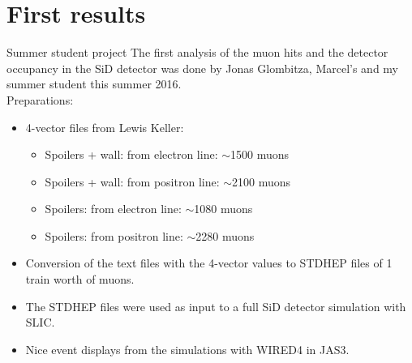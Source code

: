 \documentclass[xcolor={dvipsnames}]{beamer}
\begin{document}
\section{First results}
\begin{frame}{Summer student project}
The first analysis of the muon hits and the detector occupancy in the SiD detector was done by Jonas Glombitza, Marcel's and my summer student this summer 2016.\\
\vspace*{0.5cm}
Preparations:
\begin{itemize}
\item 4-vector files from Lewis Keller:
\begin{itemize}
 \item Spoilers + wall: from electron line: $\sim$1500 muons
 \item Spoilers + wall: from positron line: $\sim$2100 muons
 \item Spoilers: from electron line: $\sim$1080 muons
 \item Spoilers: from positron line: $\sim$2280 muons
\end{itemize}
\item Conversion of the text files with the 4-vector values to  STDHEP files of 1 train worth of muons.
\item The STDHEP files were used as input to a full SiD detector simulation with SLIC.
\item Nice event displays from the simulations with WIRED4 in JAS3.
\end{itemize}

\end{frame}
\end{document}
